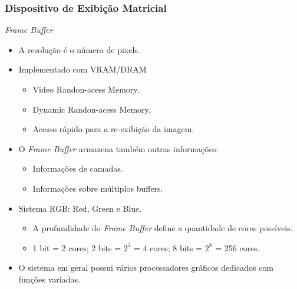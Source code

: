 \documentclass{beamer}
\begin{document}
\begin{frame}
\frametitle{Dispositivo de Exibição Matricial}

	\begin{block}{\textit{Frame Buffer}}
		\begin{itemize}
			\item<1-> A resolução é o número de pixels.
			\item<2-> Implementado com VRAM/DRAM
				\begin{itemize}
					\item Video Randon-acess Memory.
					\item Dynamic Randon-acess Memory.
					\item Acesso rápido para a re-exibição da imagem.
				\end{itemize}
			\item<3-> O \textit{Frame Buffer} armazena também outras informações:
				\begin{itemize}
					\item Informações de camadas.
					\item Informações sobre múltiplos buffers.
				\end{itemize}
			\item<4-> Sistema RGB: Red, Green e Blue.
				\begin{itemize}
					\item A profundidade do \textit{Frame Buffer} define a quantidade de cores possíveis.
					\item 1 bit = 2 cores; 2 bits = $2^2$ = 4 cores; 8 bits = $2^8$ = 256 cores.
				\end{itemize}
			\item<5-> O sistema em geral possui vários processadores gráficos dedicados com funções variadas.

		\end{itemize}
	\end{block}


\end{frame}

\end{document}
